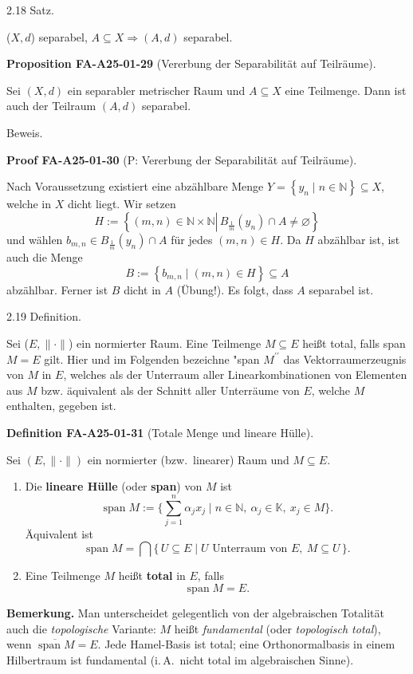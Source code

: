 \documentclass[10pt, letterpaper]{article}
\newcommand{\CustomHeading}[3]{%
  \par\medskip\noindent%
  \textbf{#1 #2} \textnormal{(#3)}.\enskip%
}
\newenvironment{DEF}[2]{\begin{unitbox}\CustomHeading{Definition}{#1}{#2}}{\end{unitbox}}
\newenvironment{PROP}[2]{\begin{unitbox}\CustomHeading{Proposition}{#1}{#2}}{\end{unitbox}}
\newenvironment{PROOF}[2]{\begin{unitbox}\CustomHeading{Proof}{#1}{#2}}{\end{unitbox}}
\begin{document}
2.18 Satz. 

($X,d$) separabel, $A \subseteq X \Longrightarrow(A, d)$ separabel.



\begin{PROP}{FA-A25-01-29}{Vererbung der Separabilität auf Teilräume}
Sei $(X,d)$ ein separabler metrischer Raum und $A\subseteq X$ eine Teilmenge.  
Dann ist auch der Teilraum $(A,d)$ separabel.
\end{PROP}

Beweis. 

\begin{PROOF}{FA-A25-01-30}{P: Vererbung der Separabilität auf Teilräume}
Nach Voraussetzung existiert eine abzählbare Menge $Y=\left\{y_{n} \mid n \in \mathbb{N}\right\} \subseteq X$, welche in $X$ dicht liegt. Wir setzen
$$
H:=\left\{(m, n) \in \mathbb{N} \times \mathbb{N} \left\lvert\, B_{\frac{1}{m}}\left(y_{n}\right) \cap A \neq \varnothing\right.\right\}
$$
und wählen $b_{m, n} \in B_{\frac{1}{m}}\left(y_{n}\right) \cap A$ für jedes $(m, n) \in H$. Da $H$ abzählbar ist, ist auch die Menge
$$
B:=\left\{b_{m, n} \mid(m, n) \in H\right\} \subseteq A
$$
abzählbar. Ferner ist $B$ dicht in $A$ (Übung!). Es folgt, dass $A$ separabel ist.
\end{PROOF}


2.19 Definition. 

Sei ($E,\|\cdot\|$) ein normierter Raum. Eine Teilmenge $M \subseteq E$ heißt total, falls span $M=E$ gilt. Hier und im Folgenden bezeichne "span $M^{\prime \prime}$ das Vektorraumerzeugnis von $M$ in $E$, welches als der Unterraum aller Linearkombinationen von Elementen aus $M$ bzw. äquivalent als der Schnitt aller Unterräume von $E$, welche $M$ enthalten, gegeben ist.



\begin{DEF}{FA-A25-01-31}{Totale Menge und lineare Hülle}
Sei $(E,\|\cdot\|)$ ein normierter (bzw.\ linearer) Raum und $M\subseteq E$.

\begin{enumerate}[label=(\alph*)]
\item Die \textbf{lineare Hülle} (oder \textbf{span}) von $M$ ist
\[
\operatorname{span} M
:= \bigl\{\textstyle\sum_{j=1}^{n}\alpha_j x_j \;\big|\; n\in\mathbb{N},\ \alpha_j\in\mathbb{K},\ x_j\in M\bigr\}.
\]
Äquivalent ist
\[
\operatorname{span} M=\bigcap\{\,U\subseteq E \mid U\text{ Unterraum von }E,\ M\subseteq U\,\}.
\]

\item Eine Teilmenge $M$ heißt \textbf{total} in $E$, falls
\[
\operatorname{span} M = E.
\]
\end{enumerate}

\textbf{Bemerkung.}
Man unterscheidet gelegentlich von der algebraischen Totalität auch die \emph{topologische} Variante:
$M$ heißt \emph{fundamental} (oder \emph{topologisch total}), wenn $\overline{\operatorname{span} M}=E$.
Jede Hamel-Basis ist total; eine Orthonormalbasis in einem Hilbertraum ist fundamental (i.\,A.\ nicht total im algebraischen Sinne).
\end{DEF}
\end{document}
